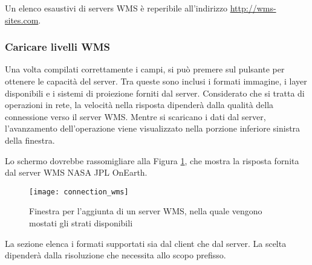 Un elenco esaustivi di servers WMS è reperibile all'indirizzo \url{http://wms-sites.com}.

\subsubsection{Caricare livelli WMS}\label{sec:ogc-wms-layers}

Una volta compilati correttamente i campi, si può premere sul pulsante
 per ottenere le capacità del server. Tra queste sono inclusi
i formati immagine, i layer disponibili e i sistemi di proiezione forniti dal
server. Considerato che si tratta di operazioni in rete, la velocità nella
risposta dipenderà dalla qualità della connessione verso il server WMS. Mentre
si scaricano i dati dal server, l'avanzamento dell'operazione viene
visualizzato nella porzione inferiore sinistra della finestra. 

Lo schermo dovrebbe rassomigliare alla Figura \ref{fig:connection_wms}, che
mostra la risposta fornita dal server WMS NASA JPL OnEarth.

\begin{figure}[ht]
  \begin{center}
  	\caption{Finestra per l'aggiunta di un server WMS, nella quale vengono
	mostati gli strati disponibili \nixcaption}\label{fig:connection_wms}
	\texttt{[image: connection\_wms]}
  \end{center}
\end{figure}


La sezione  elenca i formati supportati sia dal client
che dal  server. La scelta dipenderà dalla risoluzione che necessita allo scopo
prefisso.

\begin{Tip}[ht]\caption{\textsc{Codifica immagine}}
\end{Tip}

